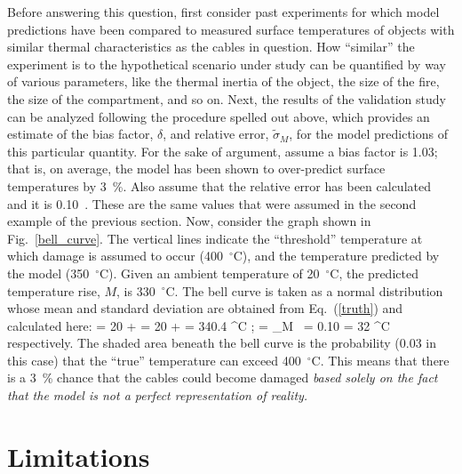 Before answering this question, first consider past experiments for which model predictions have been compared to measured surface temperatures of objects
with similar thermal characteristics as the cables in question. How ``similar'' the experiment is to the hypothetical scenario under study can be quantified by way of
various parameters, like the thermal inertia of the object, the size of the fire, the size of the compartment, and so on. Next, the results of the validation study can be
analyzed following the procedure spelled out above, which provides an estimate of the bias factor, $\delta$, and relative error, $\tilde{\sigma}_M$, for the model
predictions of this particular quantity. For the sake of argument, assume a bias factor is 1.03; that is, on average, the model has been shown to over-predict
surface temperatures by 3~\%. Also assume that the relative error has been calculated and it is 0.10~. These are the same values that were assumed in the second example
of the previous section.
Now, consider the graph shown in Fig.~\ref{bell_curve}.
The vertical lines indicate the ``threshold'' temperature at which damage is assumed to occur (400~$^\circ$C), and the temperature predicted by the
model (350~$^\circ$C). Given an ambient temperature of 20~$^\circ$C, the predicted temperature rise, $M$, is 330~$^\circ$C.
The bell curve is taken as a normal distribution whose mean and standard deviation are obtained from Eq.~(\ref{truth}) and calculated here:
\be \mu = 20 +  = 20 +  = 340.4 \; ^\circ \hbox{C}  \quad ; \quad
   \sigma = \widetilde{\sigma}_M \,  = 0.10 \times {} = 32 \; ^\circ \hbox{C}  \ee
respectively. The shaded area beneath the bell curve is the probability (0.03 in this case) that the ``true'' temperature can exceed 400~$^\circ$C.
This means that there is a 3~\% chance that the cables could
become damaged {\em based solely on the fact that the model is not a perfect representation of reality.}



\section{Limitations}

